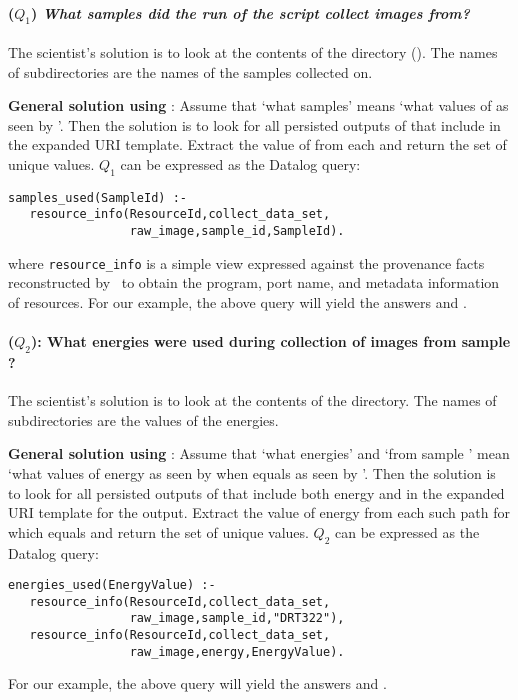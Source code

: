 \paragraph{($Q_1$) \emph{What samples did the run of the script
  collect images from?}} 
The scientist's solution is to look at the contents of the
 directory (). The names of
subdirectories are the names of the samples collected on.

\textbf{General solution using \yw}: Assume that `what samples' means
`what values of  as seen by
'. Then the solution is to look for all
persisted outputs of  that include
 in the expanded URI template.
Extract the value of  from each and return the set of
unique values. $Q_1$ can be expressed as the Datalog query:
\begin{small}
\begin{verbatim}
samples_used(SampleId) :- 
   resource_info(ResourceId,collect_data_set,
                 raw_image,sample_id,SampleId).
\end{verbatim}
\end{small}
where {\tt resource\_info} is a simple view expressed against the
provenance facts reconstructed by \yw\ to obtain the program, port
name, and metadata information of resources.  For our example, the
above query will yield the answers  and .


\paragraph{($Q_2$): What energies were used during collection of
  images from sample ?}
The scientist's solution is to look at the contents of the
 directory. The names of subdirectories are
the values of the energies.

\textbf{General solution using \yw}: Assume that `what energies' and
`from sample ' mean `what values of energy as seen by
 when  equals 
as seen by '.  Then the solution is to look
for all persisted outputs of  that include
both energy and  in the expanded URI template for the
output.  Extract the value of energy from each such path for which
 equals  and return the set of unique
values. $Q_2$ can be expressed as the Datalog query: 
\begin{small}
\begin{verbatim}
energies_used(EnergyValue) :-
   resource_info(ResourceId,collect_data_set,
                 raw_image,sample_id,"DRT322"),
   resource_info(ResourceId,collect_data_set,
                 raw_image,energy,EnergyValue).
\end{verbatim}
\end{small}
For our example, the above query will yield the answers 
and .

